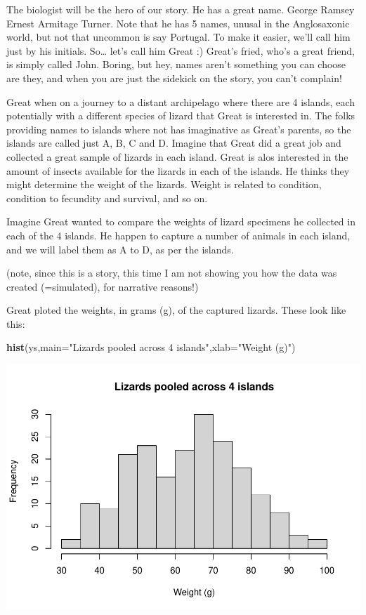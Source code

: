 \documentclass[
]{book}
\newenvironment{Shaded}{\begin{snugshade}}{\end{snugshade}}
\newcommand{\DataTypeTok}[1]{\textcolor[rgb]{0.13,0.29,0.53}{#1}}
\newcommand{\KeywordTok}[1]{\textcolor[rgb]{0.13,0.29,0.53}{\textbf{#1}}}
\newcommand{\NormalTok}[1]{#1}
\newcommand{\StringTok}[1]{\textcolor[rgb]{0.31,0.60,0.02}{#1}}
\begin{document}
The biologist will be the hero of our story. He has a great name. George Ramsey Ernest Armitage Turner. Note that he has 5 names, unusal in the Anglosaxonic world, but not that uncommon is say Portugal. To make it easier, we'll call him just by his initials. So\ldots{} let's call him Great :) Great's fried, who's a great friend, is simply called John. Boring, but hey, names aren't something you can choose are they, and when you are just the sidekick on the story, you can't complain!

Great when on a journey to a distant archipelago where there are 4 islands, each potentially with a different species of lizard that Great is interested in. The folks providing names to islands where not has imaginative as Great's parents, so the islands are called just A, B, C and D. Imagine that Great did a great job and collected a great sample of lizards in each island. Great is alos interested in the amount of insects available for the lizards in each of the islands. He thinks they might determine the weight of the lizards. Weight is related to condition, condition to fecundity and survival, and so on.

Imagine Great wanted to compare the weights of lizard specimens he collected in each of the 4 islands. He happen to capture a number of animals in each island, and we will label them as A to D, as per the islands.

(note, since this is a story, this time I am not showing you how the data was created (=simulated), for narrative reasons!)

Great ploted the weights, in grams (g), of the captured lizards. These look like this:

\begin{Shaded}
\begin{Highlighting}[]
\KeywordTok{hist}\NormalTok{(ys,}\DataTypeTok{main=}\StringTok{"Lizards pooled across 4 islands"}\NormalTok{,}\DataTypeTok{xlab=}\StringTok{"Weight (g)"}\NormalTok{)}
\end{Highlighting}
\end{Shaded}

\includegraphics{ECOMODbook_files/figure-latex/a10.2-1.pdf}
\end{document}
